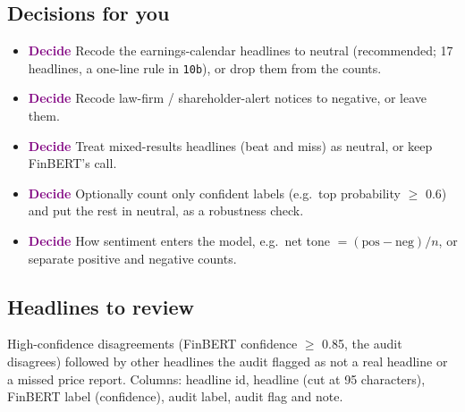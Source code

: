 \documentclass[11pt]{article}
\newcommand{\decide}{\textcolor{Purple}{\textbf{Decide}}}
\newcommand{\var}[1]{\texttt{#1}}
\begin{document}
\subsection{Decisions for you}
\begin{itemize}
  \item \decide{} Recode the earnings-calendar headlines to neutral (recommended; 17 headlines, a one-line rule in \var{10b}), or drop them from the counts.
  \item \decide{} Recode law-firm / shareholder-alert notices to negative, or leave them.
  \item \decide{} Treat mixed-results headlines (beat and miss) as neutral, or keep FinBERT's call.
  \item \decide{} Optionally count only confident labels (e.g.\ top probability $\ge$ 0.6) and put the rest in neutral, as a robustness check.
  \item \decide{} How sentiment enters the model, e.g.\ net tone $=(\text{pos}-\text{neg})/n$, or separate positive and negative counts.
\end{itemize}

\subsection{Headlines to review}
High-confidence disagreements (FinBERT confidence $\ge$ 0.85, the audit disagrees) followed by other headlines the audit flagged as not a real headline or a missed price report. Columns: headline id, headline (cut at 95 characters), FinBERT label (confidence), audit label, audit flag and note.
\end{document}
